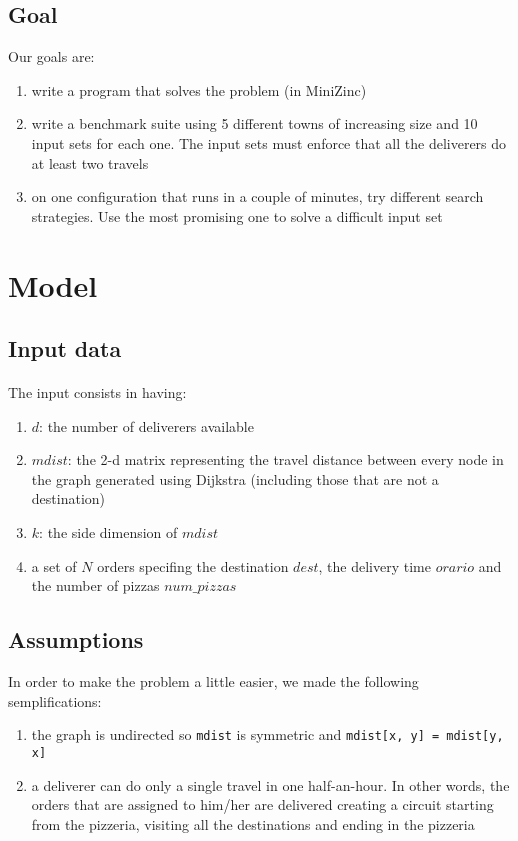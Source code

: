 \documentclass[10pt]{article}
\begin{document}
	\subsection{Goal}

	Our goals are:
	\begin{enumerate}
		\item write a program that solves the problem (in MiniZinc)
		\item write a benchmark suite using 5 different towns of increasing size
			and 10 input sets for each one. The input sets must enforce that all
			the deliverers do at least two travels
		\item on one configuration that runs in a couple of minutes, try
			different search strategies. Use the most promising one to solve a
			difficult input set
	\end{enumerate}

	\section{Model}
	\label{Model}

	
	\subsection{Input data}

	\paragraph*{}
	The input consists in having:
	\begin{enumerate}
		\item $d$: the number of deliverers available
		\item $mdist$: the 2-d matrix representing the travel distance between
			every node in the graph generated using Dijkstra (including those
			that are not a destination)
		\item $k$: the side dimension of $mdist$
		\item a set of $N$ orders specifing the destination $dest$, the delivery 
			time $orario$ and the number of pizzas $num\_pizzas$
	\end{enumerate}

	\subsection{Assumptions}
	In order to make the problem a little easier, we made the following 
	semplifications:
	\begin{enumerate}
		\item the graph is undirected so \texttt{mdist}	is symmetric and 
			\texttt{mdist[x, y] = mdist[y, x]}
		\item a deliverer can do only a single travel in one half-an-hour. In other
			words, the orders that are assigned to him/her are delivered creating 
			a circuit starting from the pizzeria, visiting all the destinations 
			and ending in the pizzeria
	\end{enumerate}
\end{document}
